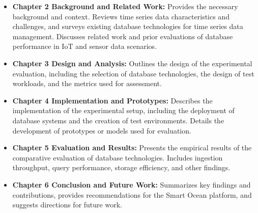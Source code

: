 \begin{itemize}
      \item \textbf{Chapter 2 \- Background and Related Work:} Provides the
            necessary background and context. Reviews time series data
            characteristics and challenges, and surveys existing database
            technologies for time series data management. Discusses related
            work and prior evaluations of database performance in IoT and
            sensor data scenarios.
      \item \textbf{Chapter 3 \- Design and Analysis:} Outlines the design of
            the experimental evaluation, including the selection of database
            technologies, the design of test workloads, and the metrics used
            for assessment.
      \item \textbf{Chapter 4 \- Implementation and Prototypes:} Describes the
            implementation of the experimental setup, including the deployment
            of database systems and the creation of test environments. Details
            the development of prototypes or models used for evaluation.
      \item \textbf{Chapter 5 \- Evaluation and Results:} Presents the
            empirical results of the comparative evaluation of database
            technologies. Includes ingestion throughput, query performance,
            storage efficiency, and other findings.
      \item \textbf{Chapter 6 \- Conclusion and Future Work:} Summarizes key
            findings and contributions, provides recommendations for the Smart
            Ocean platform, and suggests directions for future work.
\end{itemize}
